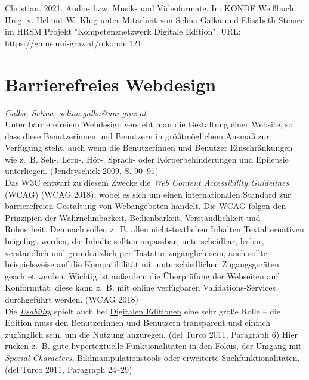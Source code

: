 \documentclass{article}
\begin{document}
Christian. 2021. Audio- bzw. Musik- und Videoformate. In: KONDE Weißbuch. Hrsg. v. Helmut W. Klug unter Mitarbeit von Selina Galka und Elisabeth Steiner im HRSM Projekt "Kompetenznetzwerk Digitale Edition". URL: https://gams.uni-graz.at/o:konde.121\newpage\section*{Barrierefreies Webdesign} \emph{Galka, Selina; selina.galka@uni-graz.at }\\
        
    Unter barrierefreiem Webdesign versteht man die Gestaltung einer Website, so dass diese Benutzerinnen und Benutzern in größtmöglichem Ausmaß zur Verfügung steht, auch wenn die  Benutzerinnen und Benutzer Einschränkungen wie z. B. Seh-, Lern-, Hör-, Sprach-  oder Körperbehinderungen und Epilepsie unterliegen. (Jendryschick 2009, S. 90–91)\\
            
        Das W3C entwarf zu diesem Zwecke die \emph{Web Content Accessibility Guidelines} (WCAG) (WCAG 2018), wobei es sich um einen internationalen Standard zur barrierefreien Gestaltung von Webangeboten handelt. Die WCAG folgen den Prinzipien der Wahrnehmbarkeit, Bedienbarkeit, Verständlichkeit und Robustheit. Demnach sollen z. B. allen nicht-textlichen Inhalten Textalternativen beigefügt werden, die Inhalte sollten anpassbar, unterscheidbar, lesbar, verständlich und grundsätzlich per Tastatur zugänglich sein, auch sollte beispielsweise auf die Kompatibilität mit unterschiedlichen Zugangsgeräten geachtet werden. Wichtig ist außerdem die Überprüfung der Webseiten auf Konformität; diese kann z. B. mit online verfügbaren Validations-Services durchgeführt werden. (WCAG 2018)\\
            
        Die \emph{\href{http://gams.uni-graz.at/o:konde.205}{Usability}} spielt auch bei \href{http://gams.uni-graz.at/o:konde.59}{Digitalen Editionen} eine sehr große Rolle – die Edition muss den Benutzerinnen und Benutzern transparent und einfach zugänglich sein, um die Nutzung anzuregen. (del Turco 2011, Paragraph 6) Hier rücken z. B. gute hypertextuelle Funktionalitäten in den Fokus, der Umgang mit \emph{Special Characters}, Bildmanipulationstools oder erweiterte Suchfunktionalitäten. (del Turco 2011, Paragraph 24–29)\\
            
\end{document}
